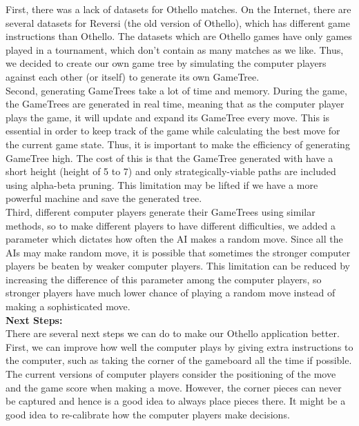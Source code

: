 \documentclass[fontsize=11pt]{article}
\begin{document}
First, there was a lack of datasets for Othello matches. On the Internet, there are several datasets for Reversi (the old version of Othello), which has different game instructions than Othello. The datasets which are Othello games have only games played in a tournament, which don't contain as many matches as we like. Thus, we decided to create our own game tree by simulating the computer players against each other (or itself) to generate its own GameTree.\\

Second, generating GameTrees take a lot of time and memory. During the game, the GameTrees are generated in real time, meaning that as the computer player plays the game, it will update and expand its GameTree every move. This is essential in order to keep track of the game while calculating the best move for the current game state. Thus, it is important to make the efficiency of generating GameTree high. The cost of this is that the GameTree generated with have a short height (height of 5 to 7) and only strategically-viable paths are included using alpha-beta pruning. This limitation may be lifted if we have a more powerful machine and save the generated tree.\\

Third, different computer players generate their GameTrees using similar methods, so to make different players to have different difficulties, we added a parameter which dictates how often the AI makes a random move. Since all the AIs may make random move, it is possible that sometimes the stronger computer players be beaten by weaker computer players. This limitation can be reduced by increasing the difference of this parameter among the computer players, so stronger players have much lower chance of playing a random move instead of making a sophisticated move.\\

\textbf{Next Steps:}\\

There are several next steps we can do to make our Othello application better.\\

First, we can improve how well the computer plays by giving extra instructions to the computer, such as taking the corner of the gameboard all the time if possible. The current versions of computer players consider the positioning of the move and the game score when making a move. However, the corner pieces can never be captured and hence is a good idea to always place pieces there. It might be a good idea to re-calibrate how the computer players make decisions.\\
\end{document}
